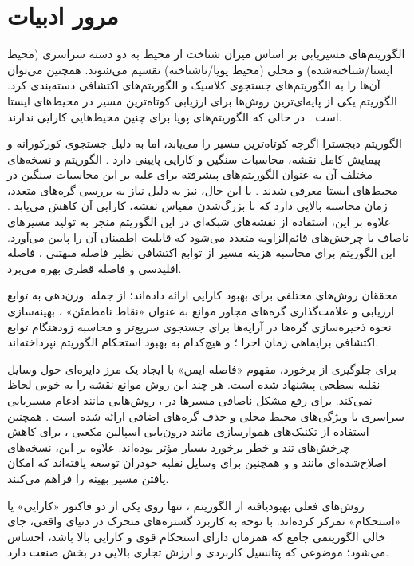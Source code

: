 \chapter{مرور ادبیات‌}\label{ch2}
الگوریتم‌های مسیریابی بر اساس میزان شناخت از محیط به دو دسته سراسری  (محیط ایستا/شناخته‌شده) و محلی  (محیط پویا/ناشناخته) تقسیم می‌شوند. همچنین می‌توان آن‌ها را به الگوریتم‌های جستجوی کلاسیک و الگوریتم‌های اکتشافی دسته‌بندی کرد. الگوریتم  یکی از پایه‌ای‌ترین روش‌ها برای ارزیابی کوتاه‌ترین مسیر در محیط‌های ایستا است \cite{karur2021survey, dudi2020shortest}. در حالی که الگوریتم‌های پویا برای چنین محیط‌هایی کارایی ندارند.

الگوریتم دیجسترا  اگرچه کوتاه‌ترین مسیر را می‌یابد، اما به دلیل جستجوی کورکورانه و پیمایش کامل نقشه، محاسبات سنگین و کارایی پایینی دارد \cite{karur2021survey}. الگوریتم  و نسخه‌های مختلف آن به عنوان الگوریتم‌های پیشرفته برای غلبه بر این محاسبات سنگین در محیط‌های ایستا معرفی شدند \cite{liu2017global}. با این حال،  نیز به دلیل نیاز به بررسی گره‌های متعدد، زمان محاسبه بالایی دارد که با بزرگ‌شدن مقیاس نقشه، کارایی آن کاهش می‌یابد \cite{wang2021overview}. علاوه بر این، استفاده از نقشه‌های شبکه‌ای  در این الگوریتم منجر به تولید مسیرهای ناصاف با چرخش‌های قائم‌الزاویه متعدد می‌شود که قابلیت اطمینان آن را پایین می‌آورد. این الگوریتم برای محاسبه هزینه مسیر از توابع اکتشافی نظیر فاصله منهتنی \cite{singh2018constrained}، فاصله اقلیدسی و فاصله قطری \cite{yang2015path} بهره می‌برد.

محققان روش‌های مختلفی برای بهبود کارایی  ارائه داده‌اند؛ از جمله: وزن‌دهی به توابع ارزیابی و علامت‌گذاری گره‌های مجاور موانع به عنوان «نقاط نامطمئن» \cite{qingji2005feasible}، بهینه‌سازی نحوه ذخیره‌سازی گره‌ها در آرایه‌ها برای جستجوی سریع‌تر  \cite{peng2015robot}و محاسبه زودهنگام توابع اکتشافی برایماهی زمان اجرا \cite{guruji2016time}؛   و هیچ‌کدام به بهبود استحکام   الگوریتم نپرداخته‌اند.

برای جلوگیری از برخورد، مفهوم «فاصله ایمن» با ایجاد یک مرز دایره‌ای حول وسایل نقلیه سطحی پیشنهاد شده است. هر چند این روش موانع نقشه را به خوبی لحاظ نمی‌کند. برای رفع مشکل ناصافی مسیرها در ، روش‌هایی مانند ادغام مسیریابی سراسری با ویژگی‌های محیط محلی و حذف گره‌های اضافی ارائه شده است \cite{zhang2018dynamic}. همچنین استفاده از تکنیک‌های هموارسازی مانند درون‌یابی اسپالین مکعبی  \cite{song2019smoothed}، برای کاهش چرخش‌های تند و خطر برخورد بسیار مؤثر بوده‌اند. علاوه بر این، نسخه‌های اصلاح‌شده‌ای مانند  و  \cite{hart1968formal} و همچنین  برای وسایل نقلیه خودران توسعه یافته‌اند که امکان یافتن مسیر بهینه را فراهم می‌کنند.

روش‌های فعلی بهبودیافته از الگوریتم ، تنها روی یکی از دو فاکتور «کارایی» یا «استحکام» تمرکز کرده‌اند. با توجه به کاربرد گستره‌های متحرک در دنیای واقعی، جای خالی الگوریتمی جامع که همزمان دارای استحکام قوی و کارایی بالا باشد، احساس می‌شود؛ موضوعی که پتانسیل کاربردی و ارزش تجاری بالایی در بخش صنعت دارد.
